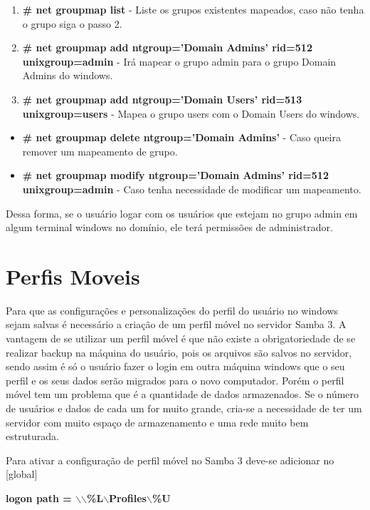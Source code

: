 \clearpage

\begin{enumerate}
	\item \textbf{\# net groupmap list} - Liste os grupos existentes mapeados, caso não tenha o grupo siga o passo 2.		
	\item \textbf{\# net groupmap add ntgroup='Domain Admins' rid=512 unixgroup=admin} - Irá mapear o grupo admin para o grupo Domain Admins do windows.
	\item \textbf{\# net groupmap add ntgroup='Domain Users' rid=513 unixgroup=users} - Mapea o grupo users com o Domain Users do windows.
\end{enumerate}

\begin{itemize}
	\item \textbf{\# net groupmap delete ntgroup='Domain Admins'} - Caso queira remover um mapeamento de grupo.
	\item \textbf{\# net groupmap modify ntgroup='Domain Admins' rid=512 unixgroup=admin} - Caso tenha necessidade de modificar um mapeamento.
\end{itemize}

Dessa forma, se o usuário logar com os usuários que estejam no grupo admin em algum terminal windows no domínio, ele terá permissões de administrador.

\section{Perfis Moveis}

Para que as configurações e personalizações do perfil do usuário no windows sejam salvas é necessário a criação de um perfil móvel no servidor Samba 3. 
A vantagem de se utilizar um perfil móvel é que não existe a obrigatoriedade de se realizar backup na máquina do usuário, pois os arquivos são salvos no servidor, sendo assim é só o usuário fazer o login em outra máquina windows que o seu perfil e os seus dados serão migrados para o novo computador. Porém o perfil móvel tem um problema que é a quantidade de dados armazenados. Se o número de usuários e dados de cada um for muito grande, cria-se a necessidade de ter um servidor com muito espaço de armazenamento e uma rede muito bem estruturada. 

Para ativar a configuração de perfil móvel no Samba 3 deve-se adicionar no [global] 

\textbf	{logon path = $\backslash$$\backslash$\%L$\backslash$Profiles$\backslash$\%U}

